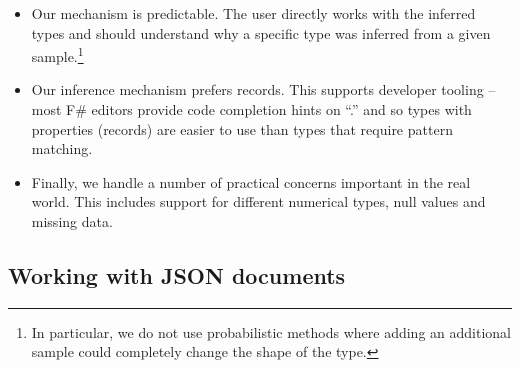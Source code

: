 \documentclass[10pt,preprint,blind,clearpagebib]{sigplanconf}
\newcommand{\kvd}[1]{\textnormal{\textcolor{kvdclr}{\sffamily #1}}}
\begin{document}
\begin{itemize}
\item Our mechanism is predictable. The user directly works with the inferred types and should 
  understand why a specific type was inferred from a given sample.\footnote{In particular, we do 
  not use probabilistic methods where adding an additional sample could completely change the 
  shape of the type.}

\item Our inference mechanism prefers records. This supports developer tooling --
  most F\# editors provide code completion hints on ``.'' and so types with properties (records)
  are easier to use than types that require pattern matching.

\item Finally, we handle a number of practical concerns important in the real world. This includes 
  support for different numerical types, \kvd{null} values and missing data.
\end{itemize}


\subsection{Working with JSON documents}
\label{sec:providers-json}
\end{document}
